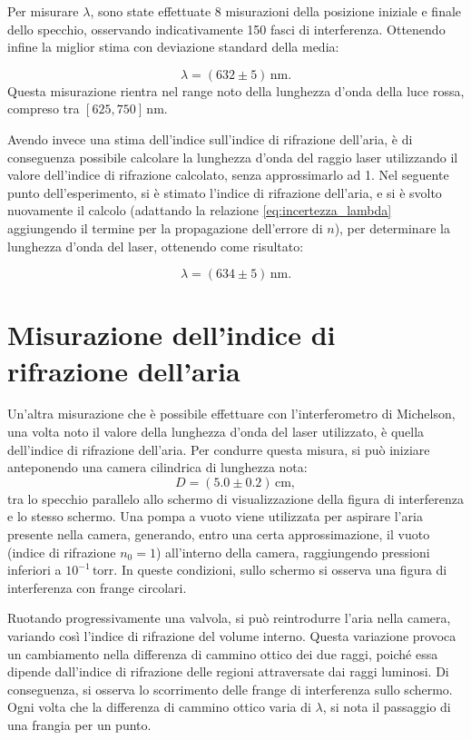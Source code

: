\documentclass[a4paper,12pt]{article}
\begin{document}
Per misurare \( \lambda \), sono state effettuate 8 misurazioni della posizione iniziale e finale dello specchio, osservando indicativamente 150 fasci di interferenza. 
Ottenendo infine la miglior stima con deviazione standard della media:

\begin{equation}
\lambda = (632 \pm 5) \, \text{nm}.
\label{eq:valore_lambda}
\end{equation}
Questa misurazione rientra nel range noto della lunghezza d’onda della luce rossa, compreso tra \( [625, 750] \, \text{nm} \).

Avendo invece una stima dell’indice sull’indice di rifrazione dell’aria, è di conseguenza possibile calcolare la lunghezza d’onda del raggio laser utilizzando il valore dell’indice di rifrazione calcolato, senza approssimarlo ad 1. 
Nel seguente punto dell’esperimento, si è stimato l’indice di rifrazione dell’aria, e si è svolto nuovamente il calcolo (adattando la relazione \ref{eq:incertezza_lambda} aggiungendo il termine per la propagazione dell'errore di \(n\)), per determinare la lunghezza d’onda del laser, ottenendo come risultato: 

\begin{equation}
    \lambda = (634 \pm 5) \, \text{nm}.
    \label{eq:valore_lambda_2}
    \end{equation}

\section{Misurazione dell’indice di rifrazione dell’aria}

Un’altra misurazione che è possibile effettuare con l’interferometro di Michelson, una volta noto il valore della lunghezza d’onda del laser utilizzato, è quella dell’indice di rifrazione dell’aria.
Per condurre questa misura, si può iniziare anteponendo una camera cilindrica di lunghezza nota:
\[
D = (5.0 \pm 0.2) \, \text{cm},
\]
tra lo specchio parallelo allo schermo di visualizzazione della figura di interferenza e lo stesso schermo. Una pompa a vuoto viene utilizzata per aspirare l’aria presente nella camera, generando, entro una certa approssimazione, il vuoto (indice di rifrazione \(n_0 = 1\)) all’interno della camera, raggiungendo pressioni inferiori a \(10^{-1} \, \text{torr}\). In queste condizioni, sullo schermo si osserva una figura di interferenza con frange circolari.

Ruotando progressivamente una valvola, si può reintrodurre l’aria nella camera, variando così l’indice di rifrazione del volume interno. Questa variazione provoca un cambiamento nella differenza di cammino ottico dei due raggi, poiché essa dipende dall’indice di rifrazione delle regioni attraversate dai raggi luminosi. Di conseguenza, si osserva lo scorrimento delle frange di interferenza sullo schermo. Ogni volta che la differenza di cammino ottico varia di \( \lambda \), si nota il passaggio di una frangia per un punto.
\end{document}
